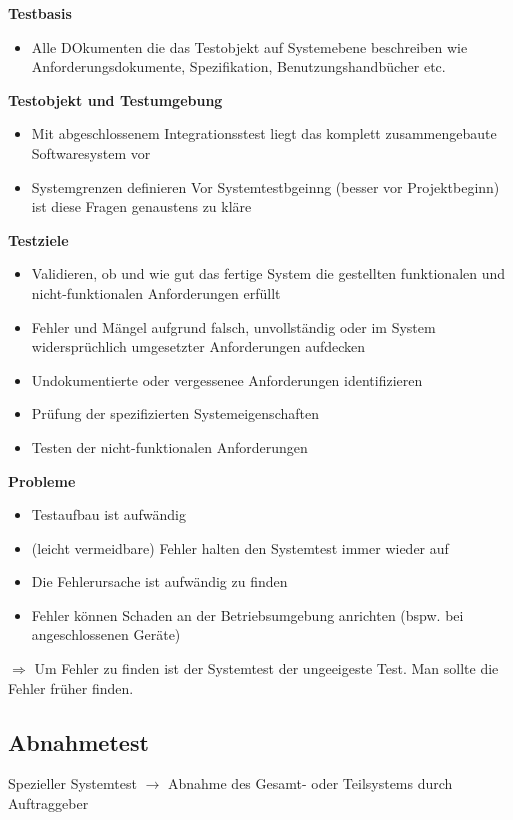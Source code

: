 \documentclass{report}
\theoremstyle{definition}
\theoremstyle{example}
\begin{document}
\textbf{Testbasis}
\begin{itemize}
   \item Alle DOkumenten die das Testobjekt auf Systemebene beschreiben wie Anforderungsdokumente, Spezifikation, Benutzungshandbücher etc.
\end{itemize}

\textbf{Testobjekt und Testumgebung}
\begin{itemize}
   \item Mit abgeschlossenem Integrationsstest liegt das komplett zusammengebaute Softwaresystem vor
   \item Systemgrenzen definieren
   \subitem Vor Systemtestbgeinng (besser vor Projektbeginn) ist diese Fragen genaustens zu kläre
\end{itemize}

\textbf{Testziele}
\begin{itemize}
   \item Validieren, ob und wie gut das fertige System die gestellten funktionalen und nicht-funktionalen Anforderungen erfüllt
   \item Fehler und Mängel aufgrund falsch, unvollständig oder im System widersprüchlich umgesetzter Anforderungen aufdecken
   \item Undokumentierte oder vergessenee Anforderungen identifizieren
   \item Prüfung der spezifizierten Systemeigenschaften
   \item Testen der nicht-funktionalen Anforderungen
\end{itemize}

\textbf{Probleme}
\begin{itemize}
   \item Testaufbau ist aufwändig
   \item (leicht vermeidbare) Fehler halten den Systemtest immer wieder auf
   \item Die Fehlerursache ist aufwändig zu finden
   \item Fehler können Schaden an der Betriebsumgebung anrichten (bspw. bei angeschlossenen Geräte)
\end{itemize}
$\Rightarrow$ Um Fehler zu finden ist der Systemtest der ungeeigeste Test. Man sollte die Fehler früher finden.

\subsection{Abnahmetest}
Spezieller Systemtest $\rightarrow$ Abnahme des Gesamt- oder Teilsystems durch Auftraggeber
\end{document}
